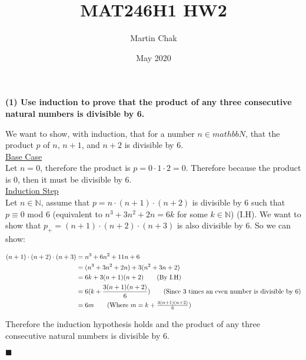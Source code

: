 \documentclass[20pt]{article}
\title{MAT246H1 HW2}
\author{Martin Chak}
\date{May 2020}
\begin{document}
\noindent
\textbf{(1) Use induction to prove that the product of any three consecutive natural numbers is divisible by 6.}
\begin{text}
    We want to show, with induction, that for a number $n \in mathbb{N}$, that the product $p$ of $n$, $n + 1$, and $n + 2$ is divisible by 6.\\
    
    \noindent
    \underline{Base Case}\\
    Let $n = 0$, therefore the product is $p = 0 \cdot 1 \cdot 2 = 0$. Therefore because the product is 0, then it must be divisible by 6.\\
    
    \noindent
    \underline{Induction Step}\\
    Let $n \in \mathbb{N}$, assume that $p = n \cdot (n + 1) \cdot (n + 2)$ is divisible by 6 such that $p \equiv 0$ mod $6$ (equivalent to $n^3 + 3n^2+ 2n = 6k$ for some $k \in \mathbb{N}$) (I.H). We want to show that $p_+ = (n + 1) \cdot (n + 2) \cdot (n + 3)$ is also divisible by 6. So we can show:
    
    \begin{align}
        (n+1) \cdot (n+2) \cdot (n+3) &= n^3 + 6n^2 + 11n + 6\nonumber\\
        &=(n^3 + 3n^2 + 2n) + 3(n^2 + 3n + 2)\nonumber\\
        &= 6k + 3(n + 1)(n + 2)\nonumber\tag{By I.H}\\
        &= 6(k + \frac{3(n + 1)(n + 2)}{6})\tag{Since 3 times an even number is divisible by 6}\\
        &= 6m\tag{Where $m = k + \frac{3(n + 1)(n + 2)}{6}$}\nonumber
    \end{align}
    
    \noindent
    Therefore the induction hypothesis holds and the product of any three consecutive natural numbers is divisible by 6.
    
    \hfill $\blacksquare$
\end{text}\\
\end{document}
